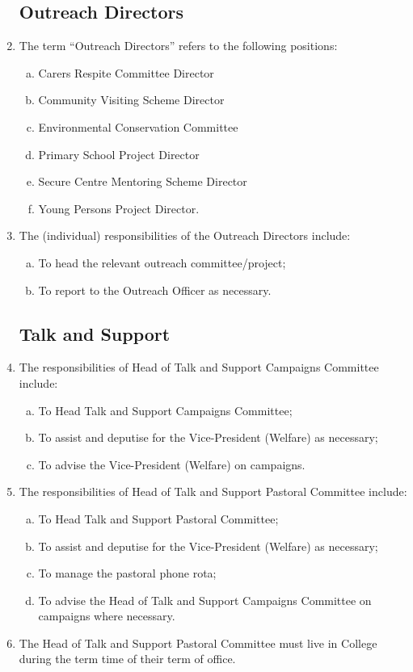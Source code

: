 \documentclass[12pt]{article}  %
\begin{document}
\begin{enumerate}
	\subsection{Outreach Directors}
	\item The term “Outreach Directors” refers to the following positions:
	\begin{enumerate}[(a)]
		\item Carers Respite Committee Director
		\item Community Visiting Scheme Director
		\item Environmental Conservation Committee
		\item Primary School Project Director
		\item Secure Centre Mentoring Scheme Director
		\item Young Persons Project Director.
	\end{enumerate}
	\item The (individual) responsibilities of the Outreach Directors include:
	\begin{enumerate}[(a)]
		\item To head the relevant outreach committee/project;
		\item To report to the Outreach Officer as necessary.
	\end{enumerate}
	\subsection{Talk and Support}
	\item The responsibilities of Head of Talk and Support Campaigns Committee include:
	\begin{enumerate}[(a)]
		\item To Head Talk and Support Campaigns Committee;
		\item To assist and deputise for the Vice-President (Welfare) as necessary;
		\item To advise the Vice-President (Welfare) on campaigns.
	\end{enumerate}
	\item The responsibilities of Head of Talk and Support Pastoral Committee include:
	\begin{enumerate}[(a)]
		\item To Head Talk and Support Pastoral Committee;
		\item To assist and deputise for the Vice-President (Welfare) as necessary;
		\item To manage the pastoral phone rota;
		\item To advise the Head of Talk and Support Campaigns Committee on campaigns where necessary.
	\end{enumerate}
	\item The Head of Talk and Support Pastoral Committee must live in College during the term time of their term of office.

\end{enumerate}
\end{document}
